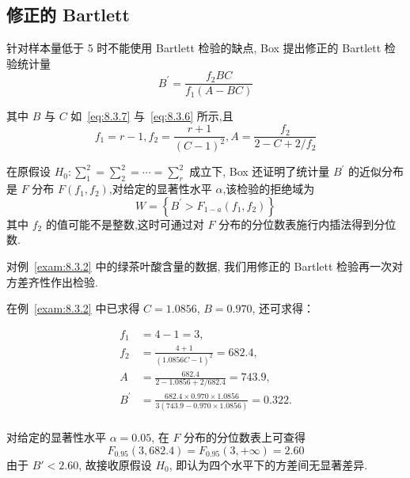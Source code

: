 \subsection{修正的 Bartlett}

针对样本量低于 5 时不能使用 Bartlett 检验的缺点, Box 提出修正的 Bartlett 检验统计量
\begin{equation}\label{eq:8.3.9}
  B^{\prime}=\frac{f_{2} B C}{f_{1}(A-B C)}
\end{equation}

其中 $B$ 与 $C$ 如~\eqref{eq:8.3.7} 与~\eqref{eq:8.3.6} 所示,且
\begin{equation*}
  f_{1}=r-1, f_{2}=\frac{r+1}{(C-1)^{2}}, A=\frac{f_{2}}{2-C+2 / f_{2}}
\end{equation*}

在原假设 $H_0: \sum^2_1 = \sum_2^2 = \cdots = \sum^2_r$ 成立下, Box 还证明了统计量 $B^{\prime}$ 的近似分布是 $F$ 分布 $F(f_1,f_2)$,对给定的显著性水平 $\alpha$,该检验的拒绝域为 
\begin{equation}\label{eq:8.3.10}
  W=\left\{B^{\prime}>F_{1-a}\left(f_{1}, f_{2}\right)\right\}
\end{equation}
其中 $f_2$ 的值可能不是整数,这时可通过对 $F$ 分布的分位数表施行内插法得到分位数.

\begin{example}\label{exam:8.3.3}
  对例~\ref{exam:8.3.2} 中的绿茶叶酸含量的数据, 我们用修正的 Bartlett 检验再一次对方差齐性作出检验.
\end{example}


在例~\ref{exam:8.3.2} 中已求得 $C = 1.0856$, $B = 0.970$, 还可求得：

\begin{align*}
  f_1 & = 4 - 1 = 3,\\
  f_2 & = \frac{4 + 1}{(1.0856 C -1)^2} = 682.4, \\ 
  A   & = \frac{682.4}{2 - 1.0856 + 2/682.4} = 743.9, \\ 
  B^{'} & = \frac{682.4 \times 0.970 \times 1.0856}{3(743.9 - 0.970 \times 1.0856)} = 0.322.\\
\end{align*}

对给定的显著性水平 $\alpha = 0.05$, 在 $F$ 分布的分位数表上可查得
\begin{equation}
  F_{0.95}(3,682.4) = F_{0.95}(3, +\infty) = 2.60
\end{equation}
由于 $B' < 2.60$, 故接收原假设 $H_{0}$, 即认为四个水平下的方差间无显著差异.

